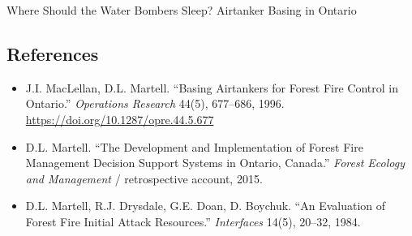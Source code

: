 \begin{casestudybox}{Where Should the Water Bombers Sleep? Airtanker Basing in Ontario}
\subsection*{References}
\begin{itemize}
\item J.I. MacLellan, D.L. Martell. ``Basing Airtankers for Forest Fire Control in Ontario.'' \emph{Operations Research} 44(5), 677--686, 1996. \url{https://doi.org/10.1287/opre.44.5.677}
\item D.L. Martell. ``The Development and Implementation of Forest Fire Management Decision Support Systems in Ontario, Canada.'' \emph{Forest Ecology and Management} / retrospective account, 2015.
\item D.L. Martell, R.J. Drysdale, G.E. Doan, D. Boychuk. ``An Evaluation of Forest Fire Initial Attack Resources.'' \emph{Interfaces} 14(5), 20--32, 1984.
\end{itemize}
\end{casestudybox}

